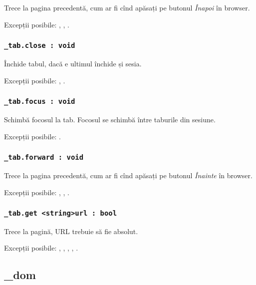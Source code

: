Trece la pagina precedentă, cum ar fi cînd apăsați pe butonul \textit{Înapoi} în browser.

Excepții posibile: , , .

\subsubsection{\lstinline|_tab.close : void|}

Închide tabul, dacă e ultimul închide și sesia.

Excepții posibile: , .

\subsubsection{\lstinline|_tab.focus : void|}

Schimbă focosul la tab. Focosul se schimbă între taburile din sesiune.

Excepții posibile: .

\subsubsection{\lstinline|_tab.forward : void|}

Trece la pagina precedentă, cum ar fi cînd apăsați pe butonul \textit{Înainte} în browser.


Excepții posibile: , , .

\subsubsection{\lstinline|_tab.get <string>url : bool|}

Trece la pagină, URL trebuie să fie absolut.

Excepții posibile: , , , , .

\subsection{{\color{orange} \_dom}}

